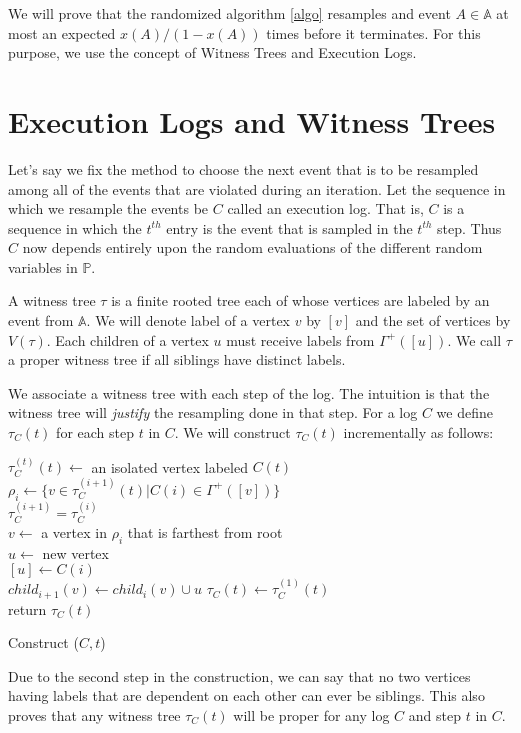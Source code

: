 We will prove that the randomized algorithm \ref{algo} resamples and event $A \in \mathbb{A}$ at most an expected $x(A)/(1-x(A) ) $ times before it terminates. For this purpose, we use the concept of Witness Trees and Execution Logs.

\section{Execution Logs and Witness Trees}
Let's say we fix the method to choose the next event that is to be resampled among all of the events that are violated during an iteration. Let the sequence in which we resample the events be $C$ called an execution log. That is, $C$ is a sequence in which the $t^{th}$ entry is the event that is sampled in the $t^{th} $ step. Thus $C$ now depends entirely upon the random evaluations of the different random variables in $\mathbb{P}$.

A witness tree $\tau$ is a finite rooted tree each of whose vertices are labeled by an event from $\mathbb{A}$. We will denote label of a vertex $v$ by $[v] $ and the set of vertices by $V(\tau)$. Each children of a vertex $u$ must receive labels from $\Gamma^+([u] ) $. We call $\tau$ a proper witness tree if all siblings have distinct labels.

We associate a witness tree with each step of the log. The intuition is that the witness tree will \emph{justify} the resampling done in that step. For a log $C$ we define $\tau_C(t) $ for each step $t$ in $C$. We will construct $\tau_C(t) $ incrementally as follows:\\
\begin{algorithm}[H]
\label{construct}
  $\tau_C^{(t)}(t) \leftarrow $  an isolated vertex labeled $C(t)$ \\
   {
     $\rho_i \leftarrow \{v\in \tau_C^{(i+1)}(t)| C(i)\in \Gamma^+([v] )\} $ \\
     $\tau_C^{(i+1)}=\tau_C^{(i)} $ \\
      {
     $v \leftarrow$ a vertex in $\rho_i$ that is farthest from root\\
     $u \leftarrow$ new vertex \\
     $[u] \leftarrow C(i)$ \\
     $child_{i+1}(v) \leftarrow child_i(v)\cup u$
     }
  $\tau_C(t)\leftarrow \tau_C^{(1)}(t) $\\
  return $\tau_C(t)$
  }
\caption{Construct ($C,t$)}
\end{algorithm}
Due to the second step in the construction, we can say that no two vertices having labels that are dependent on each other can ever be siblings. This also proves that any witness tree $\tau_C(t)$ will be proper for any log $C$ and step $t$ in $C$. 

